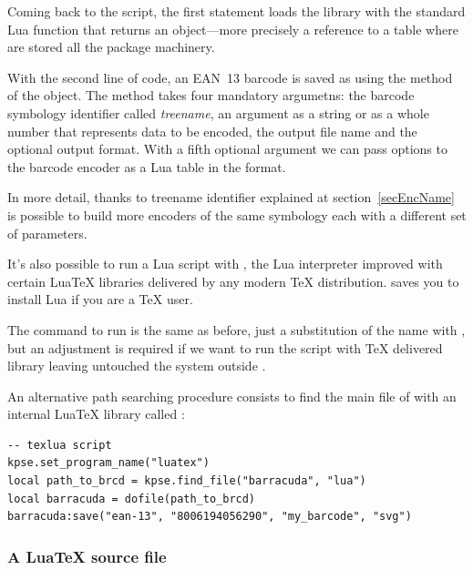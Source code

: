 \documentclass[11pt,a4paper]{article}
\begin{document}
Coming back to the script, the first statement loads the library \brcd{} with
the standard Lua function  that returns an object---more
precisely a reference to a table where are stored all the package machinery.

With the second line of code, an EAN~13 barcode is saved as
 using the method  of the \brcd{} object. The
 method takes four mandatory argumetns: the barcode symbology
identifier called \emph{treename}, an argument as a string or as a whole number
that represents data to be encoded, the output file name and the optional output
format. With a fifth optional argument we can pass options to the barcode
encoder as a Lua table in the  format.

In more detail, thanks to treename identifier explained at
section~\ref{secEncName} is possible to build more encoders of the same
symbology each with a different set of parameters.

It's also possible to run a Lua script with , the Lua interpreter
improved with certain Lua\TeX{} libraries delivered by any modern \TeX{}
distribution.  saves you to install Lua if you are a \TeX{} user.

The command to run  is the same as before, just a
substitution of the name  with , but an adjustment is
required if we want to run the script with \TeX{} delivered \brcd{} library
leaving untouched the system outside .

An alternative path searching procedure consists to find the main file of
\brcd{} with an internal Lua\TeX{} library called :
\begin{Verbatim}
-- texlua script
kpse.set_program_name("luatex")
local path_to_brcd = kpse.find_file("barracuda", "lua")
local barracuda = dofile(path_to_brcd)
barracuda:save("ean-13", "8006194056290", "my_barcode", "svg")
\end{Verbatim}


\subsubsection{A Lua\TeX{} source file}
\end{document}
